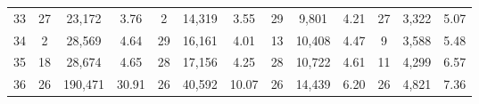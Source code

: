 \begin{table}[H]
{\begin{tabular}{c c c c c c c c c c c c c}
       33 & 27  & 23,172 &  3.76 & 2  & 14,319 &  3.55 & 29  & 9,801 &  4.21 & 27  & 3,322 &  5.07 \\ 
       34 & 2  & 28,569 &  4.64 & 29  & 16,161 &  4.01 & 13  & 10,408 &  4.47 & 9  & 3,588 &  5.48 \\ 
       35 & 18  & 28,674 &  4.65 & 28  & 17,156 &  4.25 & 28  & 10,722 &  4.61 & 11  & 4,299 &  6.57 \\ 
       36 & 26  & 190,471 & 30.91 & 26  & 40,592 & 10.07 & 26  & 14,439 &  6.20 & 26  & 4,821 &  7.36 \\  
      
        \bottomrule
    \end{tabular}
    }
\end{table}
